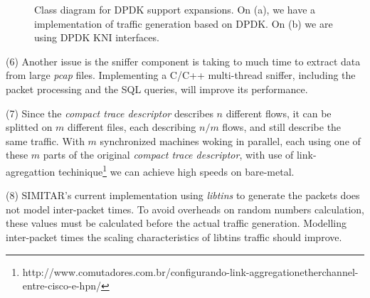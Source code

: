 \begin{figure}[h!]
	\centering
	\hspace{0mm}
	\caption{Class diagram for DPDK support expansions. On (a), we have a implementation of traffic generation based on DPDK. On (b) we are using DPDK KNI interfaces.}
	\label{fig:DpdkFlow}
\end{figure}

(6) Another issue is the sniffer component is taking to much time to extract data from large \textit{pcap} files. Implementing a C/C++ multi-thread sniffer, including the packet processing and the SQL queries, will improve its performance. 


(7) Since the \textit{compact trace descriptor} describes $n$ different flows, it can be splitted on $m$ different files, each describing $n/m$ flows, and still describe the same traffic. With $m$ synchronized machines woking in parallel, each using one of these $m$ parts of the original \textit{compact trace descriptor}, with use of link-agregattion techinique\footnote{http://www.comutadores.com.br/configurando-link-aggregationetherchannel-entre-cisco-e-hpn/} we can achieve high speeds on bare-metal. 

(8) SIMITAR's current implementation using \textit{libtins} to generate the packets does not model inter-packet times. To avoid overheads on random numbers calculation,  these values must be calculated before the actual traffic generation. Modelling inter-packet times the scaling characteristics of libtins traffic should improve. 


